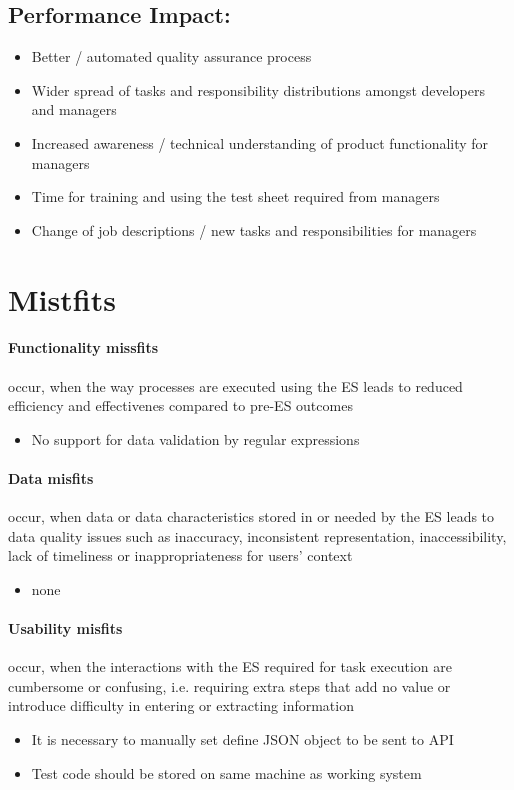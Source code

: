 \subsection{Performance Impact:}
\begin{itemize}
	\item Better / automated quality assurance process
	\item Wider spread of tasks and responsibility distributions amongst developers and managers
	\item Increased awareness / technical understanding of product functionality for managers 
	\item Time for training and using the test sheet required from managers
	\item Change of job descriptions / new tasks and responsibilities for managers
\end{itemize}

\section{Mistfits}
\paragraph{Functionality missfits} occur, when the way processes are executed using the ES leads to reduced efficiency and effectivenes compared to pre-ES outcomes 
\begin{itemize}
	\item No support for data validation by regular expressions
\end{itemize}

\paragraph{Data misfits}  occur, when data or data characteristics stored in or needed by the ES leads to data quality issues such as inaccuracy, inconsistent representation, inaccessibility, lack of timeliness or inappropriateness for users' context
\begin{itemize}
	\item none
\end{itemize}

\paragraph{Usability misfits}  occur, when the interactions with the ES required for task execution are cumbersome or confusing, i.e. requiring extra steps that add no value or introduce difficulty in entering or extracting information 
\begin{itemize}
	\item It is necessary to manually set define JSON object to be sent to API
	\item Test code should be stored on same machine as working system
\end{itemize}



